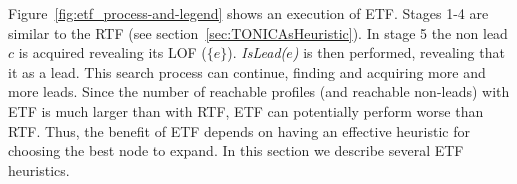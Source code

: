 \documentclass[journal]{IEEEtran}
\newcommand{\islead}[1]{{\em IsLead(#1)}}
\begin{document}
Figure~\ref{fig:etf_process-and-legend} shows an execution of ETF. Stages 1-4 are similar to the RTF (see section~\ref{sec:TONICAsHeuristic}). In stage 5 the non lead $c$ is acquired revealing its LOF ($\{e\}$). \islead{$e$} is then performed, revealing that it as a lead. This search process can continue, finding and acquiring more and more leads.
%
%
%
%
%
%
%
Since the number of reachable profiles (and reachable non-leads) with ETF is much larger than with RTF, ETF can potentially perform worse than RTF. Thus, the benefit of ETF depends on having an effective heuristic for choosing the best node to expand. In this section we describe several ETF heuristics.
\end{document}
